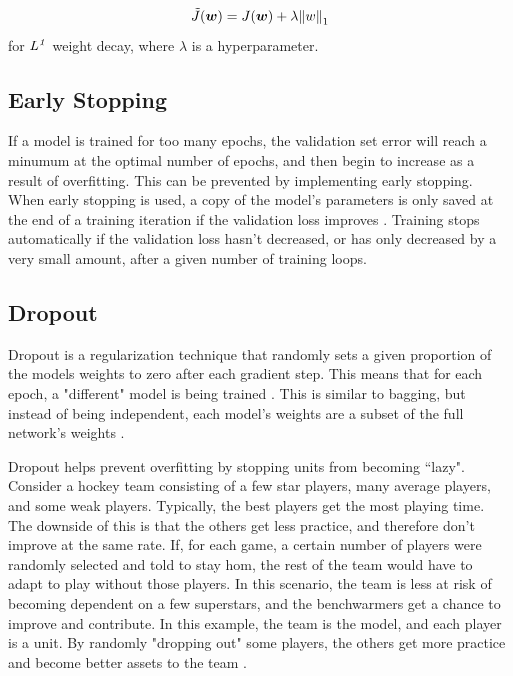 \documentclass{article}
\begin{document}
\begin{equation}
    \tilde{J}(\vb*{w}) = J(\vb*{w}) +\lambda\norm{w}_1
    \label{L1-reg}
\end{equation} for \(\it{L}^1\) weight decay, where \(\lambda\) is a hyperparameter.

\subsection{Early Stopping} %

If a model is trained for too many epochs, the validation set error will reach a minumum at the optimal number of epochs, and then begin to increase as a result of overfitting. This can be prevented by implementing early stopping. When early stopping is used, a copy of the model's parameters is only saved at the end of a training iteration if the validation loss improves \cite{Goodfellow-et-al-2016}. Training stops automatically if the validation loss hasn't decreased, or has only decreased by a very small amount, after a given number of training loops.

\subsection{Dropout} %

Dropout is a regularization technique that randomly sets a given proportion of the models weights to zero after each gradient step. This means that for each epoch, a "different" model is being trained \cite{Srivastava14}. This is similar to bagging, but instead of being independent, each model's weights are a subset of the full network's weights \cite{Goodfellow-et-al-2016}.

Dropout helps prevent overfitting by stopping units from becoming ``lazy". Consider a hockey team consisting of a few star players, many average players, and some weak players. Typically, the best players get the most playing time. The downside of this is that the others get less practice, and therefore don't improve at the same rate. If, for each game, a certain number of players were randomly selected and told to stay hom, the rest of the team would have to adapt to play without those players. In this scenario, the team is less at risk of becoming dependent on a few superstars, and the benchwarmers get a chance to improve and contribute. In this example, the team is the model, and each player is a unit. By randomly "dropping out" some players, the others get more practice and become better assets to the team \cite{hands-on-ml}.
\end{document}

